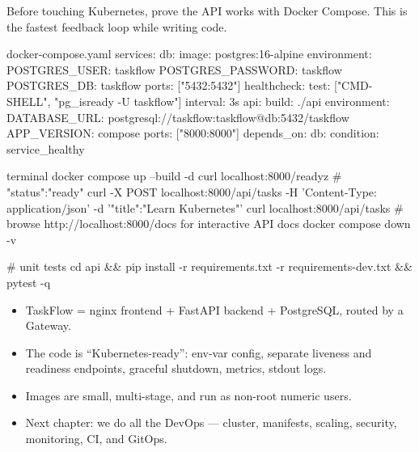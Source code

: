 Before touching Kubernetes, prove the API works with Docker Compose. This is
the fastest feedback loop while writing code.

\begin{yamlcode}{docker-compose.yaml}
services:
  db:
    image: postgres:16-alpine
    environment:
      POSTGRES_USER: taskflow
      POSTGRES_PASSWORD: taskflow
      POSTGRES_DB: taskflow
    ports: ["5432:5432"]
    healthcheck:
      test: ["CMD-SHELL", "pg_isready -U taskflow"]
      interval: 3s
  api:
    build: ./api
    environment:
      DATABASE_URL: postgresql://taskflow:taskflow@db:5432/taskflow
      APP_VERSION: compose
    ports: ["8000:8000"]
    depends_on:
      db: { condition: service_healthy }
\end{yamlcode}

\begin{bashcode}{terminal}
docker compose up --build -d
curl localhost:8000/readyz                                   # {"status":"ready"}
curl -X POST localhost:8000/api/tasks -H 'Content-Type: application/json' -d '{"title":"Learn Kubernetes"}'
curl localhost:8000/api/tasks
# browse http://localhost:8000/docs for interactive API docs
docker compose down -v

# unit tests
cd api && pip install -r requirements.txt -r requirements-dev.txt && pytest -q
\end{bashcode}

\begin{recap}
\begin{itemize}
  \item TaskFlow = nginx frontend + FastAPI backend + PostgreSQL, routed by a Gateway.
  \item The code is ``Kubernetes-ready'': env-var config, separate liveness and
        readiness endpoints, graceful shutdown, metrics, stdout logs.
  \item Images are small, multi-stage, and run as non-root numeric users.
  \item Next chapter: we do all the DevOps --- cluster, manifests, scaling,
        security, monitoring, CI, and GitOps.
\end{itemize}
\end{recap}

